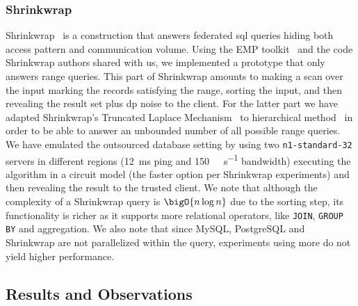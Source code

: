 		\subsubsection*{Shrinkwrap}

			Shrinkwrap~\cite{shrinkwrap} is a construction that answers federated \acrshort{sql} queries hiding both access pattern and communication volume.
			Using the EMP toolkit~\cite{emp-toolkit} and the code Shrinkwrap authors shared with us, we implemented a prototype that only answers range queries.
			This part of Shrinkwrap amounts to making a scan over the input marking the records satisfying the range, sorting the input, and then revealing the result set plus \acrshort{dp} noise to the client.
			For the latter part we have adapted Shrinkwrap's Truncated Laplace Mechanism~\cite[Definition 4]{shrinkwrap} to hierarchical method~\cite{hierarchical-methods-for-dp} in order to be able to answer an unbounded number of all possible range queries.
			We have emulated the outsourced database setting by using two \texttt{n1-standard-32} servers in different regions (\SI{12}{\milli\second} ping and \SI{150}{\mega\byte\per\second} bandwidth) executing the algorithm in a circuit model (the faster option per Shrinkwrap experiments) and then revealing the result to the trusted client.
			We note that although the complexity of a Shrinkwrap query is $\bigO{n \log n}$ due to the sorting step, its functionality is richer as it supports more relational operators, like \texttt{JOIN}, \texttt{GROUP BY} and aggregation.
			We also note that since MySQL, PostgreSQL and Shrinkwrap are not parallelized within the query, experiments using more  do not yield higher performance.

	\subsection{Results and Observations}\label{section:range-persistent:experiments:results}

